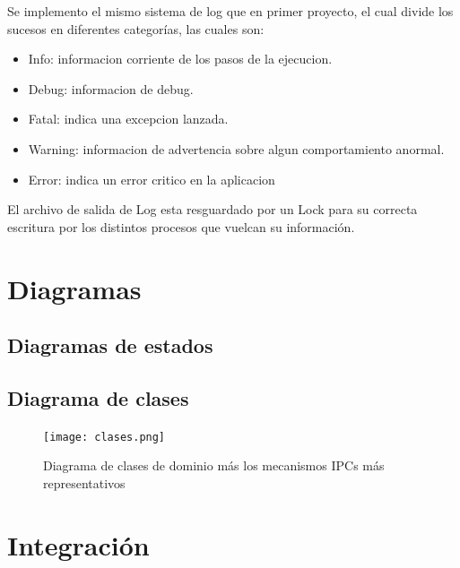 \documentclass[a4paper,12pt,titlepage]{article}
\begin{document}
Se implemento el mismo sistema de log que en primer proyecto, el cual divide los sucesos en diferentes categorías, las cuales son:
\begin{itemize}
\item Info: informacion corriente de los pasos de la ejecucion.
\item Debug: informacion de debug.
\item Fatal: indica una excepcion lanzada.
\item Warning: informacion de advertencia sobre algun comportamiento anormal.
\item Error: indica un error critico en la aplicacion
\end{itemize}
El archivo de salida de Log esta resguardado por un Lock para su correcta escritura por los distintos procesos que vuelcan su información.

\newpage
\section{Diagramas}
\subsection{Diagramas de estados}


\newpage
\subsection{Diagrama de clases}
\begin{figure}[h!]
\centering
\texttt{[image: clases.png]}
\caption{Diagrama de clases de dominio más los mecanismos IPCs más representativos}
\label{fig:clases}
\end{figure}

\newpage
\section{Integración}
\end{document}
